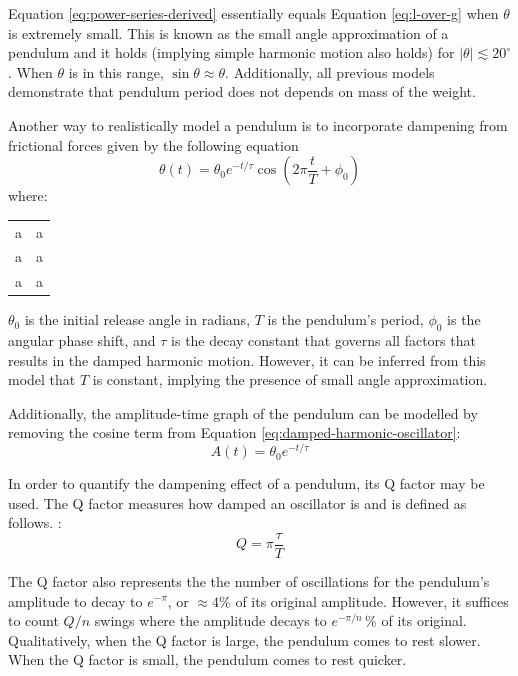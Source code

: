 \documentclass[12pt]{article}
\begin{document}
Equation \ref{eq:power-series-derived} essentially equals Equation \ref{eq:l-over-g} when $\theta$ is extremely small. This is known as the small angle approximation of a pendulum and it holds (implying simple harmonic motion also holds) for $|\theta| \lesssim 20^{\circ}$ \cite{the-simple-pendulum}. When $\theta$ is in this range, $\sin\theta \approx \theta$. Additionally, all previous models demonstrate that pendulum period does not depends on mass of the weight.

Another way to realistically model a pendulum is to incorporate dampening from frictional forces given by the following equation \cite{damped-oscillations}
\begin{equation} \label{eq:damped-harmonic-oscillator}
    \theta(t) = \theta_0 e^{-{t/\tau}} \cos\left(2\pi\frac{t}{T} + \phi_0\right)
\end{equation}
where:

\begin{tabular}{c@{{}={}}l}
    a & a\\
    a & a\\
    a & a\\
\end{tabular}

$\theta_0$ is the initial release angle in radians, $T$ is the pendulum's period, $\phi_0$ is the angular phase shift, and $\tau$ is the decay constant that governs all factors that results in the damped harmonic motion. However, it can be inferred from this model that $T$ is constant, implying the presence of small angle approximation.

Additionally, the amplitude-time graph of the pendulum can be modelled by removing the cosine term from Equation \ref{eq:damped-harmonic-oscillator}:
\begin{equation} \label{eq:amplitude-function}
    A(t) = \theta_0 e^{-{t/\tau}}
\end{equation}

In order to quantify the dampening effect of a pendulum, its Q factor may be used. The Q factor measures how damped an oscillator is and is defined as follows. \cite{pnp-physics}:
\begin{equation} \label{eq:q-factor-formula}
    Q = \pi\frac{\tau}{T}
\end{equation}

The Q factor also represents the the number of oscillations for the pendulum's amplitude to decay to $e^{-\pi}$, or $\approx 4\%$ of its original amplitude. {\color{blue}However, it suffices to count $Q/n$ swings where the amplitude decays to $e^{-\pi/n}\,\%$ of its original. Qualitatively, when the Q factor is large, the pendulum comes to rest slower. When the Q factor is small, the pendulum comes to rest quicker.}
\end{document}
